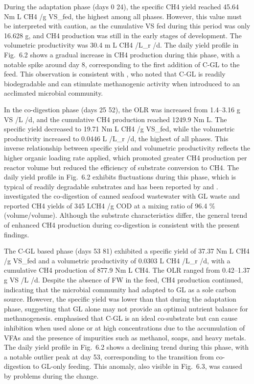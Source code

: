 \documentclass[12pt, a4paper, oneside]{report}
\begin{document}
During the adaptation phase (days 0 24), the specific CH4 yield reached 45.64 Nm L CH4 /g VS_fed, the highest among all phases. However, this value must be interpreted with caution, as the cumulative VS fed during this period was only 16.628 g, and CH4 production was still in the early stages of development. The volumetric productivity was 30.4 m L CH4 /L_r /d. The daily yield profile in Fig. 6.2 shows a gradual increase in CH4 production during this phase, with a notable spike around day \num[parse-numbers=false]{8}, corresponding to the first addition of C-GL to the feed. This observation is consistent with \textcite{gebreegziabher2025}, who noted that C-GL is readily biodegradable and can stimulate methanogenic activity when introduced to an acclimated microbial community.

In the co-digestion phase (days 25 52), the OLR was increased from 1.4–3.16 g VS /L /d, and the cumulative CH4 production reached 1249.9 Nm L. The specific yield decreased to 19.71 Nm L CH4 /g VS_fed, while the volumetric productivity increased to 0.0446 L /L_r /d, the highest of all phases. This inverse relationship between specific yield and volumetric productivity reflects the higher organic loading rate applied, which promoted greater CH4 production per reactor volume but reduced the efficiency of substrate conversion to CH4. The daily yield profile in Fig. 6.2 exhibits fluctuations during this phase, which is typical of readily degradable substrates and has been reported by \textcite{tomczak2025} and \textcite{srimachai2025}. \textcite{srimachai2025} investigated the co-digestion of canned seafood wastewater with GL waste and reported CH4 yields of 345 \m LCH4 /g COD at a mixing ratio of 96.4 \% (volume/volume). Although the substrate characteristics differ, the general trend of enhanced CH4 production during co-digestion is consistent with the present findings.

The C-GL based phase (days 53 81) exhibited a specific yield of 37.37 Nm L CH4 /g VS_fed and a volumetric productivity of 0.0303 L CH4 /L_r /d, with a cumulative CH4 production of 877.9 Nm L CH4. The OLR ranged from 0.42–1.37 g VS /L /d. Despite the absence of FW in the feed, CH4 production continued, indicating that the microbial community had adapted to GL as a sole carbon source. However, the specific yield was lower than that during the adaptation phase, suggesting that GL alone may not provide an optimal nutrient balance for methanogenesis. \textcite{tomczak2025} emphasised that C-GL is an ideal co-substrate but can cause inhibition when used alone or at high concentrations due to the accumulation of VFAs and the presence of impurities such as methanol, soaps, and heavy metals. The daily yield profile in Fig. 6.2 shows a declining trend during this phase, with a notable outlier peak at day \num[parse-numbers=false]{53}, corresponding to the transition from co-digestion to GL-only feeding. This anomaly, also visible in Fig. 6.3, was caused by problems during the change.
\end{document}

